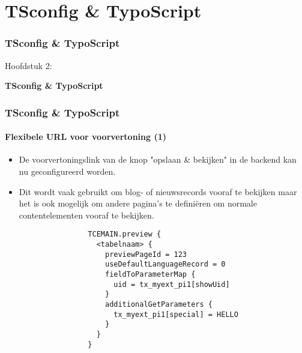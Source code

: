 %

\section{TSconfig \& TypoScript}
\begin{frame}[fragile]
	\frametitle{TSconfig \& TypoScript}

	\begin{center}\huge{Hoofdstuk 2:}\end{center}
	\begin{center}\huge{\color{typo3darkgrey}\textbf{TSconfig \& TypoScript}}\end{center}

\end{frame}

\begin{frame}[fragile]
	\frametitle{TSconfig \& TypoScript}
	\framesubtitle{Flexibele URL voor voorvertoning (1)}

	\lstset{basicstyle=\tiny\ttfamily}

	\begin{itemize}

		\item De voorvertoningslink van de knop "opslaan \& bekijken" in de backend kan nu\newline
			geconfigureerd worden.

		\item Dit wordt vaak gebruikt om blog- of nieuwsrecords vooraf te bekijken maar het
			is ook mogelijk om andere pagina's te definiëren om normale contentelementen
			vooraf te bekijken.

			\begin{lstlisting}
				TCEMAIN.preview {
				  <tabelnaam> {
				    previewPageId = 123
				    useDefaultLanguageRecord = 0
				    fieldToParameterMap {
				      uid = tx_myext_pi1[showUid]
				    }
				    additionalGetParameters {
				      tx_myext_pi1[special] = HELLO
				    }
				  }
				}
			\end{lstlisting}

	\end{itemize}

\end{frame}

